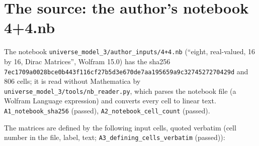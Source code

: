 \documentclass[
  10pt,
]{article}
\begin{document}
\hypertarget{the-source-the-authors-notebook-44.nb}{%
\section{The source: the author's notebook
4+4.nb}\label{the-source-the-authors-notebook-44.nb}}

The notebook \texttt{universe\_model\_3/author\_inputs/4+4.nb} (``eight,
real-valued, 16 by 16, Dirac Matrices'', Wolfram 15.0) has the sha256
\texttt{7ec1709a0028bce0b443f116cf27b5d3e670de7aa195659a9c3274527270429d}
and 806 cells; it is read without Mathematica by
\texttt{universe\_model\_3/tools/nb\_reader.py}, which parses the
notebook file (a Wolfram Language expression) and converts every cell to
linear text. \texttt{A1\_notebook\_sha256} (passed),
\texttt{A2\_notebook\_cell\_count} (passed).

The matrices are defined by the following input cells, quoted verbatim
(cell number in the file, label, text;
\texttt{A3\_defining\_cells\_verbatim} (passed)):
\end{document}
